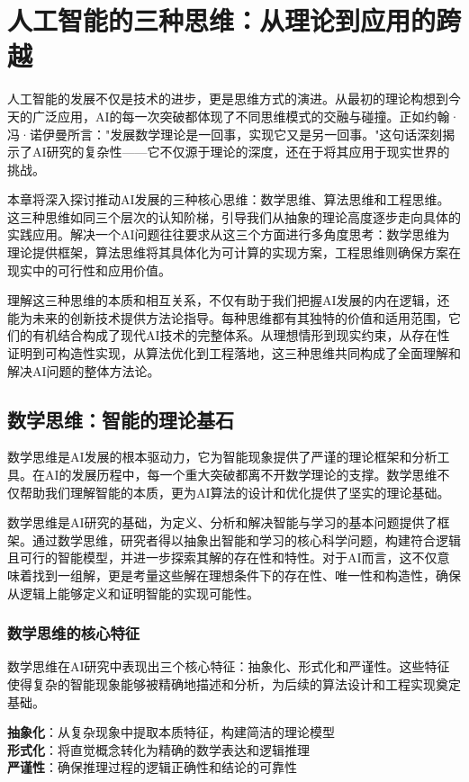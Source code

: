 
\chapter{人工智能的三种思维：从理论到应用的跨越}

人工智能的发展不仅是技术的进步，更是思维方式的演进。从最初的理论构想到今天的广泛应用，AI的每一次突破都体现了不同思维模式的交融与碰撞。正如约翰·冯·诺伊曼所言："发展数学理论是一回事，实现它又是另一回事。"这句话深刻揭示了AI研究的复杂性——它不仅源于理论的深度，还在于将其应用于现实世界的挑战。

本章将深入探讨推动AI发展的三种核心思维：数学思维、算法思维和工程思维。这三种思维如同三个层次的认知阶梯，引导我们从抽象的理论高度逐步走向具体的实践应用。解决一个AI问题往往要求从这三个方面进行多角度思考：数学思维为理论提供框架，算法思维将其具体化为可计算的实现方案，工程思维则确保方案在现实中的可行性和应用价值。

理解这三种思维的本质和相互关系，不仅有助于我们把握AI发展的内在逻辑，还能为未来的创新技术提供方法论指导。每种思维都有其独特的价值和适用范围，它们的有机结合构成了现代AI技术的完整体系。从理想情形到现实约束，从存在性证明到可构造性实现，从算法优化到工程落地，这三种思维共同构成了全面理解和解决AI问题的整体方法论。

\section{数学思维：智能的理论基石}

数学思维是AI发展的根本驱动力，它为智能现象提供了严谨的理论框架和分析工具。在AI的发展历程中，每一个重大突破都离不开数学理论的支撑。数学思维不仅帮助我们理解智能的本质，更为AI算法的设计和优化提供了坚实的理论基础。

数学思维是AI研究的基础，为定义、分析和解决智能与学习的基本问题提供了框架。通过数学思维，研究者得以抽象出智能和学习的核心科学问题，构建符合逻辑且可行的智能模型，并进一步探索其解的存在性和特性。对于AI而言，这不仅意味着找到一组解，更是考量这些解在理想条件下的存在性、唯一性和构造性，确保从逻辑上能够定义和证明智能的实现可能性。

\subsection{数学思维的核心特征}

数学思维在AI研究中表现出三个核心特征：抽象化、形式化和严谨性。这些特征使得复杂的智能现象能够被精确地描述和分析，为后续的算法设计和工程实现奠定基础。

\begin{tcolorbox}[colback=blue!5!white,colframe=blue!75!black,title=核心概念：数学思维的三大特征]
\textbf{抽象化}：从复杂现象中提取本质特征，构建简洁的理论模型\\
\textbf{形式化}：将直觉概念转化为精确的数学表达和逻辑推理\\
\textbf{严谨性}：确保推理过程的逻辑正确性和结论的可靠性
\end{tcolorbox}

